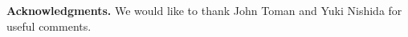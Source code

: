 \vspace{6mm}
{\bf{Acknowledgments.}}
We would like to thank John Toman and Yuki Nishida for useful comments.